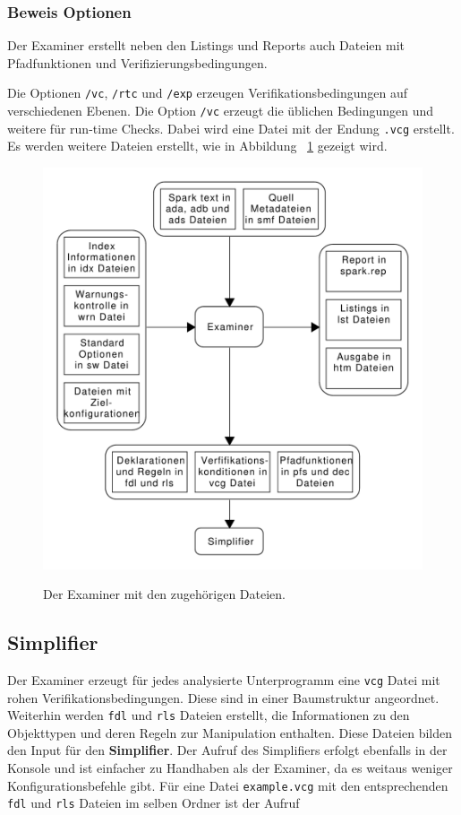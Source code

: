 \subsubsection{Beweis Optionen}
Der Examiner erstellt neben den Listings und Reports auch Dateien mit Pfadfunktionen und Verifizierungsbedingungen.

Die Optionen \texttt{/vc}, \texttt{/rtc} und \texttt{/exp} erzeugen Verifikationsbedingungen auf verschiedenen Ebenen. Die Option \texttt{/vc} erzeugt die üblichen Bedingungen und weitere für run-time Checks. Dabei wird eine Datei mit der Endung \texttt{.vcg} erstellt.
Es werden weitere Dateien erstellt, wie in Abbildung ~\ref{fig:examinerFiles} gezeigt wird.

\begin{figure}[h!]
\includegraphics[width=\textwidth{}]{images/examinerFiles.pdf}
\label{fig:examinerFiles}
\caption{Der Examiner mit den zugehörigen Dateien.}
\end{figure}

\subsection{Simplifier}
Der Examiner erzeugt für jedes analysierte Unterprogramm eine \texttt{vcg} Datei mit rohen Verifikationsbedingungen. Diese sind in einer Baumstruktur angeordnet. Weiterhin werden \texttt{fdl} und \texttt{rls} Dateien erstellt, die Informationen zu den Objekttypen und deren Regeln zur Manipulation enthalten. Diese Dateien bilden den Input für den \textbf{Simplifier}.
Der Aufruf des Simplifiers erfolgt ebenfalls in der Konsole und ist einfacher zu Handhaben als der Examiner, da es weitaus weniger Konfigurationsbefehle gibt. Für eine Datei \texttt{example.vcg} mit den entsprechenden \texttt{fdl} und \texttt{rls} Dateien im selben Ordner ist der Aufruf


